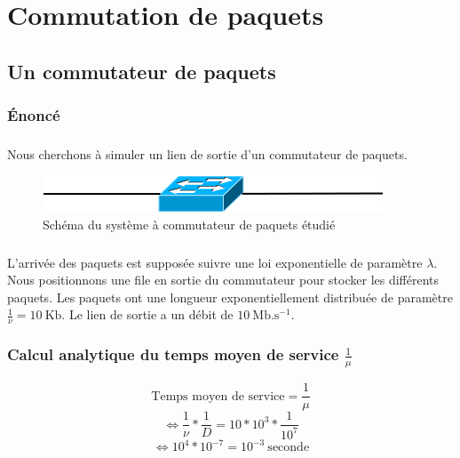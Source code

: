 %
\chapter{Commutation de paquets}
%
    \section{Un commutateur de paquets}
%
        \subsection{Énoncé}
%
            \paragraph{}
Nous cherchons à simuler un lien de sortie d'un commutateur de paquets.
%
            \begin{figure}[h]
                \centering
                \includegraphics[scale=0.7]{RSC/2-0.png}
                \caption{ Schéma du système à commutateur de paquets étudié }
                \label{ Schema du systeme a commutateur de paquets }
            \end{figure}
%
            \paragraph{}
L'arrivée des paquets est supposée suivre une loi exponentielle de paramètre $\lambda$.
Nous positionnons une file en sortie du commutateur pour stocker les différents paquets.
Les paquets ont une longueur exponentiellement distribuée de paramètre $\frac{1}{\nu} = 10 \ \text{Kb}$.
Le lien de sortie a un débit de $10 \ \text{Mb}.\text{s}^{-1}$.
%
%
        \subsection{Calcul analytique du temps moyen de service $\frac{1}{\mu}$}
%
            \[  \text{Temps moyen de service} = \frac{1}{\mu} \]
            \[ \iff \frac{1}{\nu} * \frac{1}{D} = 10 * 10^{3} * \frac{1}{10^{7}} \]
            \[ \iff 10^{4} * 10^{-7} = 10^{-3} \ \text{seconde} \]
%
%
